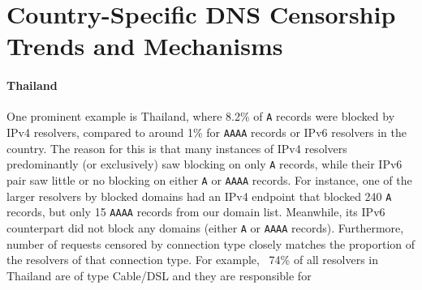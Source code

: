 \section{Country-Specific DNS Censorship Trends and Mechanisms}
\label{sec:cases}

\paragraph{Thailand} One prominent example is Thailand, where 8.2\% of
\texttt{A} records were blocked by IPv4 resolvers, compared to around 1\% for
\texttt{AAAA} records or IPv6 resolvers in the country. The reason for this is
that many instances of IPv4 resolvers predominantly (or exclusively) saw
blocking on only \texttt{A} records, while their IPv6 pair saw little or no
blocking on either \texttt{A} or \texttt{AAAA} records. For instance, one of the
larger resolvers by blocked domains had an IPv4 endpoint that blocked
240 \texttt{A} records, but only 15 \texttt{AAAA} records from our domain list.
Meanwhile, its IPv6 counterpart did not block any domains (either \texttt{A} or
\texttt{AAAA} records). Furthermore, number of requests censored by connection type
closely matches the proportion of the resolvers of that connection type. For example,
~74\% of all resolvers in Thailand are of type Cable/DSL and they are responsible for
